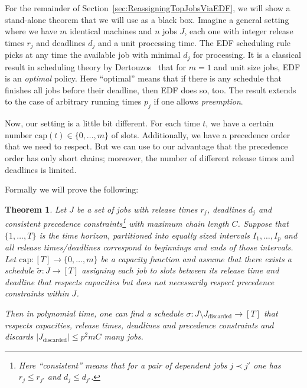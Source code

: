 \documentclass[11pt,letterpaper,oneside,english]{article}
\theoremstyle{theorem}
\newtheorem{theorem}{Theorem}
\begin{document}
For the remainder of Section~\ref{sec:ReassigningTopJobsViaEDF}, we will show a 
stand-alone theorem that we will use as a black box. Imagine a general setting where
we have $m$ identical machines and $n$ jobs $J$, each one with integer release 
times $r_j$ and deadlines $d_j$ and a unit processing time. The EDF scheduling rule picks
at any time the available job with minimal $d_j$ for processing.
It is a classical result in scheduling theory by Dertouzos~\cite{EDF-Dertouzos74} that for $m=1$
and unit size jobs, EDF is an \emph{optimal} policy. Here ``optimal'' means that if there
is any schedule that finishes all jobs before their deadline, then EDF does so, too.
The result extends to the case of arbitrary running times $p_j$ if one allows \emph{preemption}.

Now, our setting is a little bit different. For each time $t$, we have a certain number $\textrm{cap}(t) \in \{ 0,\ldots,m\}$ of slots. Additionally, we have a precedence order that we need to respect. 
But we can use to our advantage that the precedence order has only short chains; moreover, the number of different release times and deadlines is limited. 


Formally we will prove the following:
\begin{theorem}\label{thm:EDF}
Let $J$ be a set of jobs with release times $r_j$, deadlines $d_j$ and consistent
precedence constraints\footnote{Here ``consistent'' means that 
for a pair of dependent jobs $j \prec j'$ one has $r_{j} \leq r_{j'}$ and $d_j \leq d_{j'}$.} with maximum chain length $C$.
Suppose that $\{1,\ldots,T\}$ is the time horizon, partitioned into
equally sized intervals $I_1,\ldots,I_p$
and all release times/deadlines correspond to beginnings and ends of
those intervals. Let
$\textrm{cap} : [T] \to \{ 0,\ldots,m\}$
be a capacity function and assume that there exists a 
schedule $\tilde{\sigma} : J \to [T]$ assigning each job to slots between its release time and deadline that respects
capacities but does not necessarily respect precedence constraints within $J$.


Then in polynomial time, one can find a schedule $\sigma : J \setminus J_{\textrm{discarded}} \to [T]$ that respects
capacities, release times, deadlines and precedence
constraints and discards  $|J_{\textrm{discarded}}| \leq p^2mC$ many jobs.
\end{theorem}
\end{document}
